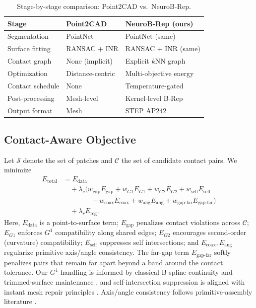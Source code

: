 \documentclass{ieeeaccess}
\begin{document}
\begin{table}[t]
  \caption{Stage-by-stage comparison: Point2CAD vs.\ NeuroB-Rep.}
  \label{tab:pipeline_comparison}
  \centering
  \footnotesize
  \setlength{\tabcolsep}{3pt}
  \begin{tabular}{l l l}
    \toprule
    \textbf{Stage} & \textbf{Point2CAD} & \textbf{NeuroB-Rep (ours)} \\
    \midrule
    Segmentation & PointNet & PointNet (same) \\
    Surface fitting & RANSAC + INR & RANSAC + INR (same) \\
    Contact graph & None (implicit) & Explicit $k$NN graph \\
    Optimization & Distance-centric & Multi-objective energy \\
    Contact schedule & None & Temperature-gated \\
    Post-processing & Mesh-level & Kernel-level B-Rep \\
    Output format & Mesh & STEP AP242 \\
    \bottomrule
  \end{tabular}
\end{table}


\subsection{Contact-Aware Objective}
Let $\mathcal{S}$ denote the set of patches and $\mathcal{C}$ the set of candidate contact pairs. We minimize
\begin{equation}
\begin{split}
\label{eq:energy}
E_{\text{total}}
&= E_{\text{data}} \\
&\quad + \lambda_c \big(
    w_{\text{gap}} E_{\text{gap}}
  + w_{G1} E_{G1}
  + w_{G2} E_{G2}
  + w_{\text{self}} E_{\text{self}} \\
&\qquad\qquad
  + w_{\text{coax}} E_{\text{coax}}
  + w_{\text{ang}} E_{\text{ang}}
  + w_{\text{gap-far}} E_{\text{gap-far}}
  \big) \\
&\quad + \lambda_r E_{\text{reg}} .
\end{split}
\end{equation}
Here, $E_{\text{data}}$ is a point-to-surface term; $E_{\text{gap}}$ penalizes contact violations across $\mathcal{C}$; $E_{G1}$ enforces $G^1$ compatibility along shared edges; $E_{G2}$ encourages second-order (curvature) compatibility; $E_{\text{self}}$ suppresses self intersections; and $E_{\text{coax}}, E_{\text{ang}}$ regularize primitive axis/angle consistency. The far-gap term $E_{\text{gap-far}}$ softly penalizes pairs that remain far apart beyond a band around the contact tolerance. Our $G^1$ handling is informed by classical B-spline continuity and trimmed-surface maintenance \cite{b10,b11,b22}, and self-intersection suppression is aligned with instant mesh repair principles \cite{b12}. Axis/angle consistency follows primitive-assembly literature \cite{b14}.
\end{document}
